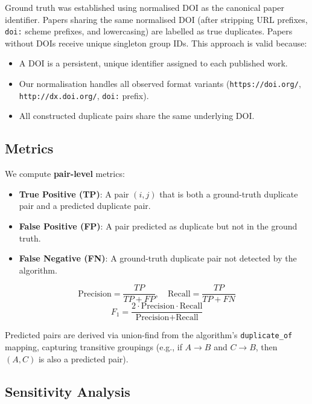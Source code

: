 \documentclass[conference]{IEEEtran}
\begin{document}
Ground truth was established using normalised DOI as the canonical paper identifier. Papers sharing the same normalised DOI (after stripping URL prefixes, \texttt{doi:} scheme prefixes, and lowercasing) are labelled as true duplicates. Papers without DOIs receive unique singleton group IDs. This approach is valid because:

\begin{itemize}
    \item A DOI is a persistent, unique identifier assigned to each published work.
    \item Our normalisation handles all observed format variants (\texttt{https://doi.org/}, \texttt{http://dx.doi.org/}, \texttt{doi:} prefix).
    \item All constructed duplicate pairs share the same underlying DOI.
\end{itemize}

\subsection{Metrics}

We compute \textbf{pair-level} metrics:

\begin{itemize}
    \item \textbf{True Positive (TP)}: A pair $(i, j)$ that is both a ground-truth duplicate pair and a predicted duplicate pair.
    \item \textbf{False Positive (FP)}: A pair predicted as duplicate but not in the ground truth.
    \item \textbf{False Negative (FN)}: A ground-truth duplicate pair not detected by the algorithm.
\end{itemize}

\begin{equation}
\text{Precision} = \frac{TP}{TP + FP}, \quad \text{Recall} = \frac{TP}{TP + FN}
\end{equation}
\begin{equation}
F_1 = \frac{2 \cdot \text{Precision} \cdot \text{Recall}}{\text{Precision} + \text{Recall}}
\end{equation}

Predicted pairs are derived via union-find from the algorithm's \texttt{duplicate\_of} mapping, capturing transitive groupings (e.g., if $A \rightarrow B$ and $C \rightarrow B$, then $(A,C)$ is also a predicted pair).

\subsection{Sensitivity Analysis}
\end{document}
